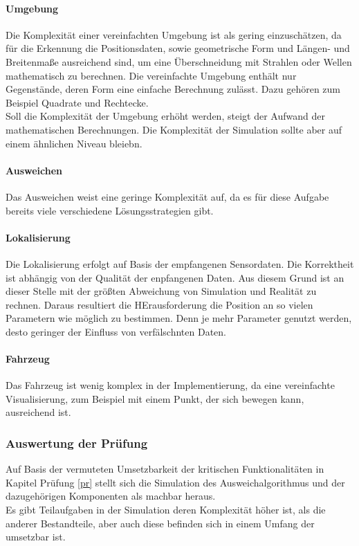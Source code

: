 \paragraph{Umgebung}
Die Komplexität einer vereinfachten Umgebung ist als gering einzuschätzen, da für die Erkennung die Positionsdaten, sowie geometrische Form und Längen- und Breitenmaße ausreichend sind, um eine Überschneidung mit Strahlen oder Wellen mathematisch zu berechnen.
Die vereinfachte Umgebung enthält nur Gegenstände, deren Form eine einfache Berechnung zulässt. Dazu gehören zum Beispiel Quadrate und Rechtecke. \\
Soll die Komplexität der Umgebung erhöht werden, steigt der Aufwand der mathematischen Berechnungen. Die Komplexität der Simulation sollte aber auf einem ähnlichen Niveau bleiebn.

\paragraph{Ausweichen}
Das Ausweichen weist eine geringe Komplexität auf, da es für diese Aufgabe bereits viele verschiedene Lösungsstrategien gibt. 

\paragraph{Lokalisierung}
Die Lokalisierung erfolgt auf Basis der empfangenen Sensordaten. Die Korrektheit ist abhängig von der Qualität der enpfangenen Daten.
Aus diesem Grund ist an dieser Stelle mit der größten Abweichung von Simulation und Realität zu rechnen. Daraus resultiert die HErausforderung die Position an so vielen Parametern wie möglich zu bestimmen.
Denn je mehr Parameter genutzt werden, desto geringer der Einfluss von verfälschnten Daten. 

\paragraph{Fahrzeug}
Das Fahrzeug ist wenig komplex in der Implementierung, da eine vereinfachte Visualisierung, zum Beispiel mit einem Punkt, der sich bewegen kann, ausreichend ist.

\subsubsection{Auswertung der Prüfung}
Auf Basis der vermuteten Umsetzbarkeit der kritischen Funktionalitäten in Kapitel Prüfung \ref{pr} stellt sich die Simulation des Ausweichalgorithmus und der dazugehörigen Komponenten als machbar heraus. \\
Es gibt Teilaufgaben in der Simulation deren Komplexität höher ist, als die anderer Bestandteile, aber auch diese befinden sich in einem Umfang der umsetzbar ist.\\


\newpage
